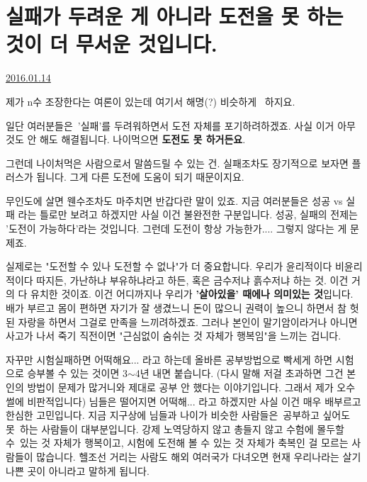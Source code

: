 \section{실패가 두려운 게 아니라 도전을 못 하는 것이 더 무서운 것입니다.}
\href{https://www.kockoc.com/Apoc/587914}{2016.01.14}

\vspace{5mm}

제가 n수 조장한다는 여론이 있는데 여기서 해명(?) 비슷하게  하지요.
\vspace{5mm}

일단 여러분들은 '실패'를 두려워하면서 도전 자체를 포기하려하겠죠.
사실 이거 아무 것도 안 해도 해결됩니다.
나이먹으면 \textbf{도전도 못 하거든요}.
\vspace{5mm}

그런데 나이처먹은 사람으로서 말씀드릴 수 있는 건.
실패조차도 장기적으로 보자면 플러스가 됩니다. 그게 다른 도전에 도움이 되기 때문이지요.
\vspace{5mm}

무인도에 살면 웬수조차도 마주치면 반갑다란 말이 있죠.
지금 여러분들은 성공 vs 실패 라는 틀로만 보려고 하겠지만 사실 이건 불완전한 구분입니다.
성공, 실패의 전제는 '도전이 가능하다'라는 것입니다.
그런데 도전이 항상 가능한가.... 그렇지 않다는 게 문제죠.
\vspace{5mm}

실제로는 "도전할 수 있나 도전할 수 없나"가 더 중요합니다.
우리가 윤리적이다 비윤리적이다 따지든, 가난하냐 부유하냐라고 하든, 혹은 금수저냐 흙수저냐 하는 것. 이건 거의 다 유치한 것이죠.
이건 어디까지나 우리가 \textbf{'살아있을' 때에나 의미있는 것}입니다.
배가 부르고 몸이 편하면 자기가 잘 생겼느니 돈이 많으니 권력이 높으니 하면서 참 헛된 자랑을 하면서 그걸로 만족을 느끼려하겠죠.
그러나 본인이 말기암이라거나 아니면 사고가 나서 죽기 직전이면 "근심없이 숨쉬는 것 자체가 행복임"을 느끼는 겁니다.
\vspace{5mm}

자꾸만 시험실패하면 어떡해요... 라고 하는데 올바른 공부방법으로 빡세게 하면 시험으로 승부볼 수 있는 것이면 3$\sim$4년 내면 붙습니다.
(다시 말해 저걸 초과하면 그건 본인의 방법이 문제가 많거니와 제대로 공부 안 했다는 이야기입니다. 그래서 제가 오수썰에 비판적입니다)
님들은 떨어지면 어떡해... 라고 하겠지만 사실 이건 매우 배부르고 한심한 고민입니다.
지금 지구상에 님들과 나이가 비슷한 사람들은 공부하고 싶어도 못 하는 사람들이 대부분입니다.
강제 노역당하지 않고 총들지 않고 수험에 몰두할 수 있는 것 자체가 행복이고,
시험에 도전해 볼 수 있는 것 자체가 축복인 걸 모르는 사람들이 많습니다.
헬조선 거리는 사람도 해외 여러국가 다녀오면 현재 우리나라는 살기 나쁜 곳이 아니라고 말하게 됩니다.
\vspace{5mm}

